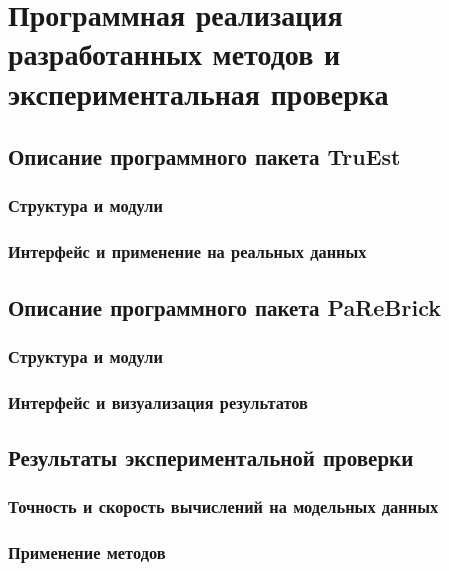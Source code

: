 \chapter{Программная реализация разработанных методов и экспериментальная проверка}
\label{chap:software_implementation}

\section{Описание программного пакета TruEst}
\label{sec:truest_package}

\subsection{Структура и модули}
\label{subsec:truest_structure}

\subsection{Интерфейс и применение на реальных данных}
\label{subsec:truest_application}

\section{Описание программного пакета PaReBrick}
\label{sec:parebrick_package}

\subsection{Структура и модули}
\label{subsec:parebrick_structure}

\subsection{Интерфейс и визуализация результатов}
\label{subsec:parebrick_application}

\section{Результаты экспериментальной проверки}
\label{sec:experimental_validation}

\subsection{Точность и скорость вычислений на модельных данных}
\label{subsec:benchmark_simulated}

\subsection{Применение методов}
\label{subsec:benchmark_realdata}
